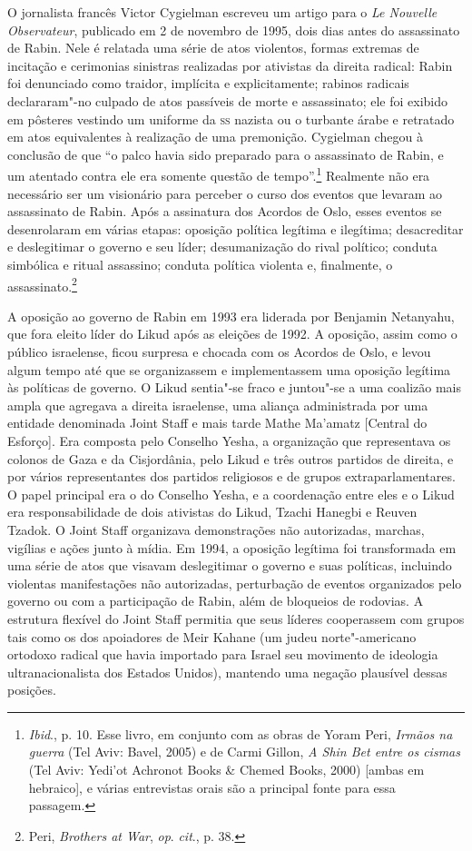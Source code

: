 O jornalista francês Victor Cygielman escreveu um artigo para o \emph{Le
Nouvelle Observateur}, publicado em 2 de novembro de 1995, dois
dias antes do assassinato de Rabin. Nele é relatada uma série de atos
violentos, formas extremas de incitação e cerimonias sinistras
realizadas por ativistas da direita radical: Rabin foi denunciado como
traidor, implícita e explicitamente; rabinos radicais declararam"-no
culpado de atos passíveis de morte e assassinato; ele foi exibido em
pôsteres vestindo um uniforme da \textsc{ss} nazista ou o turbante árabe e
retratado em atos equivalentes à realização de uma premonição. Cygielman
chegou à conclusão de que ``o palco havia sido preparado para o assassinato
de Rabin, e um atentado contra ele era somente questão de
tempo''.\footnote{\emph{Ibid}., p. 10. Esse livro, em conjunto com as obras de Yoram Peri, \emph{Irmãos na guerra} (Tel Aviv: Bavel, 2005) e de Carmi Gillon, \emph{A Shin Bet entre os cismas} (Tel
Aviv: Yedi'ot Achronot Books \& Chemed Books, 2000) {[}ambas em hebraico{]}, e várias entrevistas orais são a principal fonte para essa
passagem.} Realmente não era necessário ser um visionário para
perceber o curso dos eventos que levaram ao assassinato de Rabin. Após a
assinatura dos Acordos de Oslo, esses eventos se desenrolaram em várias
etapas: oposição política legítima e ilegítima; desacreditar e
deslegitimar o governo e seu líder; desumanização do rival político;
conduta simbólica e ritual assassino; conduta política violenta e,
finalmente, o assassinato.\footnote{Peri, \emph{Brothers at War}, \emph{op}.
\emph{cit}., p. 38.}

A oposição ao governo de Rabin em 1993 era liderada por Benjamin
Netanyahu, que fora eleito líder do Likud após as eleições de 1992. A
oposição, assim como o público israelense, ficou surpresa e chocada com
os Acordos de Oslo, e levou algum tempo até que se organizassem e
implementassem uma oposição legítima às políticas de governo. O Likud
sentia"-se fraco e juntou"-se a uma coalizão mais ampla que agregava a
direita israelense, uma aliança administrada por uma entidade
denominada Joint Staff e mais tarde Mathe Ma'amatz {[}Central do Esforço{]}.
Era composta pelo Conselho Yesha, a organização que representava os colonos
de Gaza e da Cisjordânia, pelo Likud e três outros partidos de direita, e
por vários representantes dos partidos religiosos e de grupos
extraparlamentares. O papel principal era o do Conselho Yesha, e a
coordenação entre eles e o Likud era responsabilidade de dois ativistas
do Likud, Tzachi Hanegbi e Reuven Tzadok. O Joint Staff organizava
demonstrações não autorizadas, marchas, vigílias e ações junto à mídia.
Em 1994, a oposição legítima foi transformada em uma série de atos que
visavam deslegitimar o governo e suas políticas, incluindo violentas
manifestações não autorizadas, perturbação de eventos organizados pelo
governo ou com a participação de Rabin, além de bloqueios de rodovias. A
estrutura flexível do Joint Staff permitia que seus líderes cooperassem
com grupos tais como os dos apoiadores de Meir Kahane (um judeu
norte"-americano ortodoxo radical que havia importado para Israel seu
movimento de ideologia ultranacionalista dos Estados Unidos), mantendo
uma negação plausível dessas posições.

